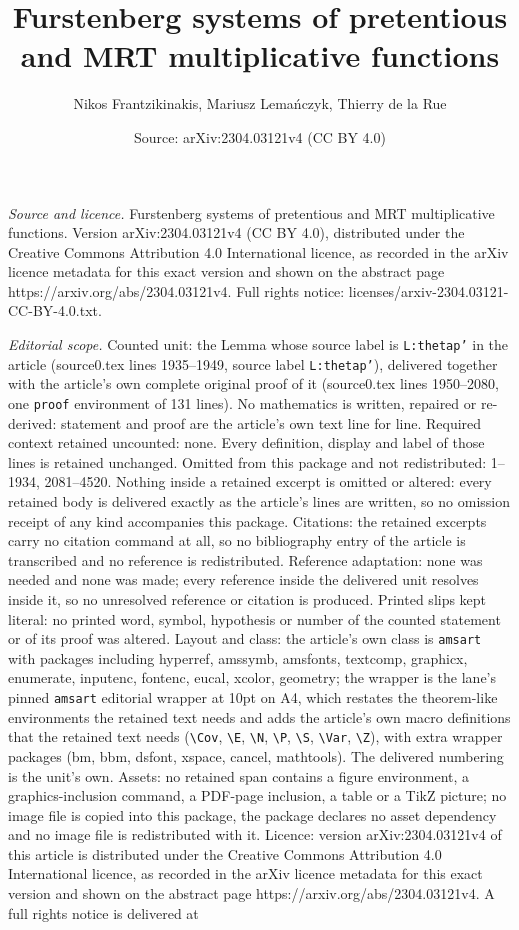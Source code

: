 \documentclass[10pt,a4paper]{amsart}
\title[Furstenberg systems of pretentious and MRT multiplicative fu]{Furstenberg systems of pretentious and MRT multiplicative functions}
\author{Nikos Frantzikinakis, Mariusz Lema\'nczyk, Thierry de la Rue}
\date{Source: arXiv:2304.03121v4 (CC BY 4.0)}
\begin{document}
\maketitle

\noindent\emph{Source and licence.} Furstenberg systems of pretentious and MRT multiplicative functions. Version arXiv:2304.03121v4 (CC BY 4.0), distributed under the Creative Commons Attribution 4.0 International licence, as recorded in the arXiv licence metadata for this exact version and shown on the abstract page https://arxiv.org/abs/2304.03121v4. Full rights notice: licenses/arxiv-2304.03121-CC-BY-4.0.txt.\par\smallskip

\noindent\textit{Editorial scope.} Counted unit: the Lemma whose source label is \texttt{L:thetap'} in the article (source0.tex lines 1935--1949, source label \texttt{L:thetap'}), delivered together with the article's own complete original proof of it (source0.tex lines 1950--2080, one \texttt{proof} environment of 131 lines). No mathematics is written, repaired or re-derived: statement and proof are the article's own text line for line. Required context retained uncounted: none. Every definition, display and label of those lines is retained unchanged. Omitted from this package and not redistributed: 1--1934, 2081--4520. Nothing inside a retained excerpt is omitted or altered: every retained body is delivered exactly as the article's lines are written, so no omission receipt of any kind accompanies this package. Citations: the retained excerpts carry no citation command at all, so no bibliography entry of the article is transcribed and no reference is redistributed. Reference adaptation: none was needed and none was made; every reference inside the delivered unit resolves inside it, so no unresolved reference or citation is produced. Printed slips kept literal: no printed word, symbol, hypothesis or number of the counted statement or of its proof was altered. Layout and class: the article's own class is \texttt{amsart} with packages including hyperref, amssymb, amsfonts, textcomp, graphicx, enumerate, inputenc, fontenc, eucal, xcolor, geometry; the wrapper is the lane's pinned \texttt{amsart} editorial wrapper at 10pt on A4, which restates the theorem-like environments the retained text needs and adds the article's own macro definitions that the retained text needs (\texttt{\textbackslash Cov}, \texttt{\textbackslash E}, \texttt{\textbackslash N}, \texttt{\textbackslash P}, \texttt{\textbackslash S}, \texttt{\textbackslash Var}, \texttt{\textbackslash Z}), with extra wrapper packages (bm, bbm, dsfont, xspace, cancel, mathtools). The delivered numbering is the unit's own. Assets: no retained span contains a figure environment, a graphics-inclusion command, a PDF-page inclusion, a table or a TikZ picture; no image file is copied into this package, the package declares no asset dependency and no image file is redistributed with it. Licence: version arXiv:2304.03121v4 of this article is distributed under the Creative Commons Attribution 4.0 International licence, as recorded in the arXiv licence metadata for this exact version and shown on the abstract page https://arxiv.org/abs/2304.03121v4. A full rights notice is delivered at 
\end{document}
